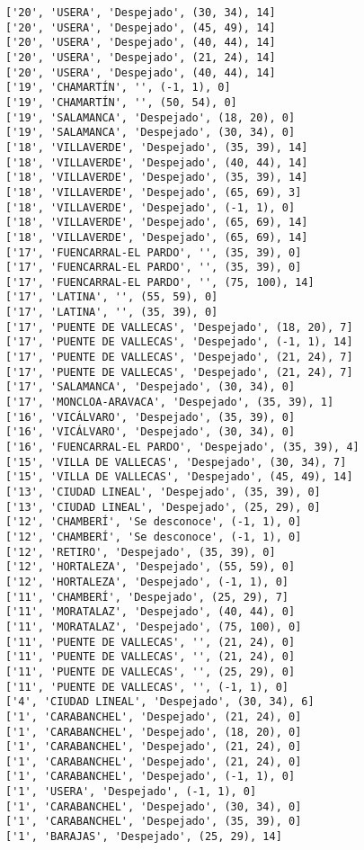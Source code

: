 \documentclass[11pt]{article}
\begin{document}
\begin{Verbatim}[commandchars=\\\{\}]
['20', 'USERA', 'Despejado', (30, 34), 14]
['20', 'USERA', 'Despejado', (45, 49), 14]
['20', 'USERA', 'Despejado', (40, 44), 14]
['20', 'USERA', 'Despejado', (21, 24), 14]
['20', 'USERA', 'Despejado', (40, 44), 14]
['19', 'CHAMARTÍN', '', (-1, 1), 0]
['19', 'CHAMARTÍN', '', (50, 54), 0]
['19', 'SALAMANCA', 'Despejado', (18, 20), 0]
['19', 'SALAMANCA', 'Despejado', (30, 34), 0]
['18', 'VILLAVERDE', 'Despejado', (35, 39), 14]
['18', 'VILLAVERDE', 'Despejado', (40, 44), 14]
['18', 'VILLAVERDE', 'Despejado', (35, 39), 14]
['18', 'VILLAVERDE', 'Despejado', (65, 69), 3]
['18', 'VILLAVERDE', 'Despejado', (-1, 1), 0]
['18', 'VILLAVERDE', 'Despejado', (65, 69), 14]
['18', 'VILLAVERDE', 'Despejado', (65, 69), 14]
['17', 'FUENCARRAL-EL PARDO', '', (35, 39), 0]
['17', 'FUENCARRAL-EL PARDO', '', (35, 39), 0]
['17', 'FUENCARRAL-EL PARDO', '', (75, 100), 14]
['17', 'LATINA', '', (55, 59), 0]
['17', 'LATINA', '', (35, 39), 0]
['17', 'PUENTE DE VALLECAS', 'Despejado', (18, 20), 7]
['17', 'PUENTE DE VALLECAS', 'Despejado', (-1, 1), 14]
['17', 'PUENTE DE VALLECAS', 'Despejado', (21, 24), 7]
['17', 'PUENTE DE VALLECAS', 'Despejado', (21, 24), 7]
['17', 'SALAMANCA', 'Despejado', (30, 34), 0]
['17', 'MONCLOA-ARAVACA', 'Despejado', (35, 39), 1]
['16', 'VICÁLVARO', 'Despejado', (35, 39), 0]
['16', 'VICÁLVARO', 'Despejado', (30, 34), 0]
['16', 'FUENCARRAL-EL PARDO', 'Despejado', (35, 39), 4]
['15', 'VILLA DE VALLECAS', 'Despejado', (30, 34), 7]
['15', 'VILLA DE VALLECAS', 'Despejado', (45, 49), 14]
['13', 'CIUDAD LINEAL', 'Despejado', (35, 39), 0]
['13', 'CIUDAD LINEAL', 'Despejado', (25, 29), 0]
['12', 'CHAMBERÍ', 'Se desconoce', (-1, 1), 0]
['12', 'CHAMBERÍ', 'Se desconoce', (-1, 1), 0]
['12', 'RETIRO', 'Despejado', (35, 39), 0]
['12', 'HORTALEZA', 'Despejado', (55, 59), 0]
['12', 'HORTALEZA', 'Despejado', (-1, 1), 0]
['11', 'CHAMBERÍ', 'Despejado', (25, 29), 7]
['11', 'MORATALAZ', 'Despejado', (40, 44), 0]
['11', 'MORATALAZ', 'Despejado', (75, 100), 0]
['11', 'PUENTE DE VALLECAS', '', (21, 24), 0]
['11', 'PUENTE DE VALLECAS', '', (21, 24), 0]
['11', 'PUENTE DE VALLECAS', '', (25, 29), 0]
['11', 'PUENTE DE VALLECAS', '', (-1, 1), 0]
['4', 'CIUDAD LINEAL', 'Despejado', (30, 34), 6]
['1', 'CARABANCHEL', 'Despejado', (21, 24), 0]
['1', 'CARABANCHEL', 'Despejado', (18, 20), 0]
['1', 'CARABANCHEL', 'Despejado', (21, 24), 0]
['1', 'CARABANCHEL', 'Despejado', (21, 24), 0]
['1', 'CARABANCHEL', 'Despejado', (-1, 1), 0]
['1', 'USERA', 'Despejado', (-1, 1), 0]
['1', 'CARABANCHEL', 'Despejado', (30, 34), 0]
['1', 'CARABANCHEL', 'Despejado', (35, 39), 0]
['1', 'BARAJAS', 'Despejado', (25, 29), 14]

\end{Verbatim}
\end{document}
